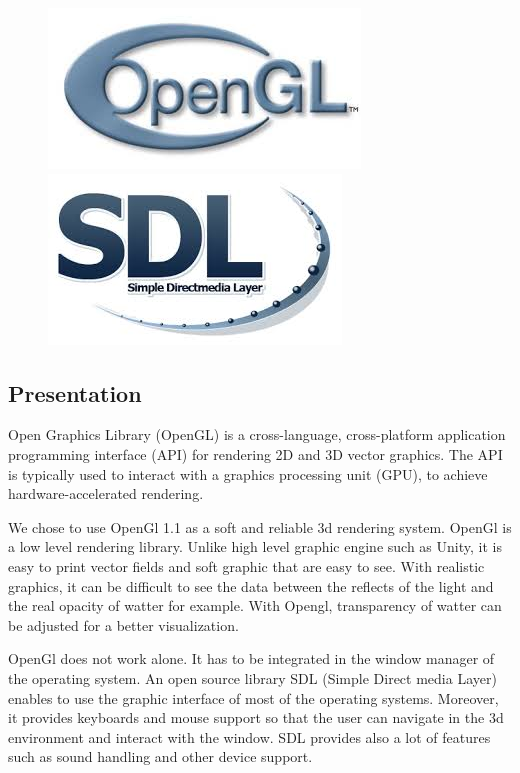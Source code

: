 \documentclass[a4paper]{report}
\begin{document}
\begin{figure}[htbp]
  \begin{minipage}[b]{0.4\textwidth}
  \centering
    \includegraphics[scale =0.3]{image/opengl.jpeg}
  \end{minipage}
  \hfill
  \begin{minipage}[b]{0.4\textwidth}
  \centering
    \includegraphics[scale = 0.3]{image/SDL.jpeg}
  \end{minipage}
\end{figure}

\subsection{Presentation}

Open Graphics Library (OpenGL) is a cross-language, cross-platform application programming interface (API) for rendering 2D and 3D vector graphics. The API is typically used to interact with a graphics processing unit (GPU), to achieve hardware-accelerated rendering.

We chose to use OpenGl 1.1 as a soft and reliable 3d rendering system. OpenGl is a low level rendering library. Unlike high level graphic engine such as Unity, it is easy to print vector fields and soft graphic that are easy to see. With realistic graphics, it can be difficult to see the data between the reflects of the light and the real opacity of watter for example. With Opengl, transparency of watter can be adjusted for a better visualization.

OpenGl does not work alone. It has to be integrated in the window manager of the operating system. An open source library SDL (Simple Direct media Layer) enables to use the graphic interface of most of the operating systems. Moreover, it provides keyboards and mouse support so that the user can navigate in the 3d environment and interact with the window. SDL provides also a lot of features such as sound handling and other device support.
 
\end{document}
